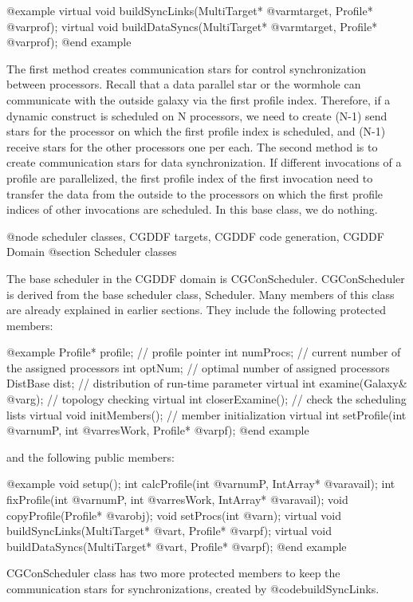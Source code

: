 {@example
virtual void buildSyncLinks(MultiTarget* @var{mtarget}, Profile* @var{prof});
virtual void buildDataSyncs(MultiTarget* @var{mtarget}, Profile* @var{prof});
@end example

The first method creates communication stars for control synchronization
between processors. Recall that a data parallel star or the wormhole
can communicate with the outside galaxy via the first profile index.
Therefore, if a dynamic construct is scheduled on N processors, we
need to create (N-1) send stars for the processor on which the first
profile index is scheduled, and (N-1) receive stars for the other
processors one per each. The second method is to create communication stars
for data synchronization. If different invocations of a profile are
parallelized, the first profile index of the first
invocation need to transfer the data from the
outside to the processors on which the first profile indices of other 
invocations are scheduled. In this base class, we do nothing.

@node scheduler classes, CGDDF targets, CGDDF code generation, CGDDF Domain
@section Scheduler classes

The base scheduler in the CGDDF domain is CGConScheduler. CGConScheduler is
derived from the base scheduler class, Scheduler. Many members of this class
are already explained in earlier sections. They include the following
protected members:

@example
Profile* profile;	// profile pointer
int numProcs;		// current number of the assigned processors
int optNum;		// optimal number of assigned processors
DistBase dist;		// distribution of run-time parameter
virtual int examine(Galaxy& @var{g});	// topology checking
virtual int closerExamine();		// check the scheduling lists
virtual void initMembers();		// member initialization
virtual int setProfile(int @var{numP}, int @var{resWork}, Profile* @var{pf});
@end example

and the following public members:

@example
void setup();
int calcProfile(int @var{numP}, IntArray* @var{avail});
int fixProfile(int @var{numP}, int @var{resWork}, IntArray* @var{avail});
void copyProfile(Profile* @var{obj});
void setProcs(int @var{n});
virtual void buildSyncLinks(MultiTarget* @var{t}, Profile* @var{pf});
virtual void buildDataSyncs(MultiTarget* @var{t}, Profile* @var{pf});
@end example

CGConScheduler class has two more protected members to keep the communication
stars for synchronizations, created by @code{buildSyncLinks}.

}
